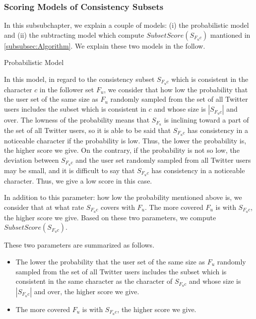 \subsubsection{Scoring Models of Consistency Subsets}
\label{subsubsec:Scoring}

In this subsubchapter, we explain a couple of models: (i) the
probabilistic model and (ii) the subtracting model which compute
$\mathit{SubsetScore(S_{F_uc})}$ mantioned in \ref{subsubsec:Algorithm}.
We explain these two models in the follow.

\begin{description}
\bf {\item[(i)] Probabilistic Model}
\end{description}

In this model, in regard to the consistency subset $S_{F_uc}$ which is
consistent in the character $c$ in the follower set $F_u$, we consider
that how low the probability that the user set of the same size as $F_u$
randomly sampled from the set of all Twitter users includes the subset
which is consistent in $c$ and whose size is $|S_{F_uc}|$ and over.
The lowness of the probability means that $S_{F_u}$ is inclining toward
a part of the set of all Twitter users, so it is able to be said that
$S_{F_uc}$ has consistency in a noticeable character if the probability
is low.  Thus, the lower the probability is, the higher score we give.
On the contrary, if the probability is
not so low,  the deviation between $S_{F_uc}$ and the user set randomly
sampled from all Twitter users may be small, and it is difficult to say
that $S_{F_uc}$ has consistency in a noticeable character.  Thus, we
give a low score in this case.

In addition to this parameter: how low the probability mentioned above
is, we consider that at what rate $S_{F_uc}$ covers with $F_u$.  The
more covered $F_u$ is with $S_{F_uc}$, the higher score we give.  Based
on these two parameters, we compute $\mathit{SubsetScore(S_{F_uc})}$.

These two parameters are summarized as follows.
\begin{itemize}
\item The lower the probability that the user set of the same size as $F_u$
randomly sampled from the set of all Twitter users includes the subset
which is consistent in the same character as the character of $S_{F_uc}$
and whose size is $|S_{F_uc}|$ and over, the higher score we give.
\item The more covered $F_u$ is with $S_{F_uc}$, the higher score we give.
\end{itemize}

